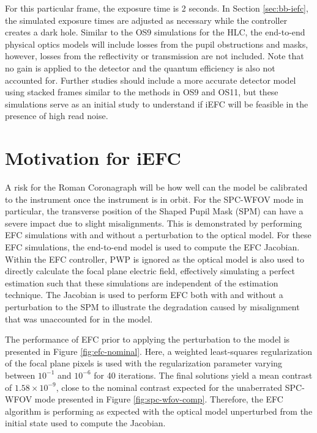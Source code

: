 \documentclass[12pt]{spieman}  %
\begin{document}
\begin{spacing}{2}
For this particular frame, the exposure time is 2 seconds. In Section \ref{sec:bb-iefc}, the simulated exposure times are adjusted as necessary while the controller creates a dark hole. Similar to the OS9 simulations for the HLC, the end-to-end physical optics models will include losses from the pupil obstructions and masks, however, losses from the reflectivity or transmission are not included\cite{ygouf-roman-hlc-os9}. Note that no gain is applied to the detector and the quantum efficiency is also not accounted for. Further studies should include a more accurate detector model using stacked frames similar to the methods in OS9 and OS11, but these simulations serve as an initial study to understand if iEFC will be feasible in the presence of high read noise. 


\section{Motivation for iEFC}
\label{sec:motive}
A risk for the Roman Coronagraph will be how well can the model be calibrated to the instrument once the instrument is in orbit. For the SPC-WFOV mode in particular, the transverse position of the Shaped Pupil Mask (SPM) can have a severe impact due to slight misalignments. This is demonstrated by performing EFC simulations with and without a perturbation to the optical model. For these EFC simulations, the end-to-end model is used to compute the EFC Jacobian. Within the EFC controller, PWP is ignored as the optical model is also used to directly calculate the focal plane electric field, effectively simulating a perfect estimation such that these simulations are independent of the estimation technique. The Jacobian is used to perform EFC both with and without a perturbation to the SPM to illustrate the degradation caused by misalignment that was unaccounted for in the model. 

The performance of EFC prior to applying the perturbation to the model is presented in Figure \ref{fig:efc-nominal}. Here, a weighted least-squares regularization of the focal plane pixels is used with the regularization parameter varying between $10^{-1}$ and $10^{-6}$ for 40 iterations. The final solutions yield a mean contrast of $1.58\times10^{-9}$, close to the nominal contrast expected for the unaberrated SPC-WFOV mode presented in Figure \ref{fig:spc-wfov-comp}. Therefore, the EFC algorithm is performing as expected with the optical model unperturbed from the initial state used to compute the Jacobian. 


\end{spacing}
\end{document}

